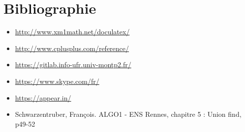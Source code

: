 \documentclass[french]{article}
\begin{document}
\section{\LARGE Bibliographie}
\begin{itemize}
    \item \url{http://www.xm1math.net/doculatex/}
    \item \url{http://www.cplusplus.com/reference/}
    \item \url{https://gitlab.info-ufr.univ-montp2.fr/}
    \item \url{https://www.skype.com/fr/}
    \item \url{https://appear.in/}
    \item Schwarzentruber, François. ALGO1 - ENS Rennes, chapitre 5 : Union find, p49-52
\end{itemize}
\end{document}

